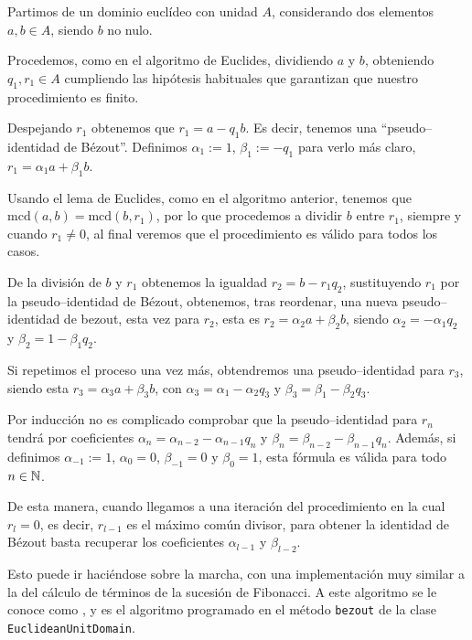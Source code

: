 \documentclass[a4paper, 11pt, twoside, notitlepage, openany, onecolumn, final]{report}
\begin{document}
	Partimos de un dominio euclídeo con unidad $A$, considerando dos elementos $a,b\in A$, siendo $b$ no nulo.
	
	Procedemos, como en el algoritmo de Euclides, dividiendo $a$ y $b$, obteniendo $q_1,r_1\in A$ cumpliendo las hipótesis habituales que garantizan que nuestro procedimiento es finito.
	
	Despejando $r_1$ obtenemos que $r_1=a-q_1b$. Es decir, tenemos una ``pseudo--identidad de Bézout''. Definimos $\alpha_1:=1$, $\beta_1:=-q_1$ para verlo más claro, $r_1 = \alpha_1a +\beta_1b$.
	
	Usando el lema de Euclides, como en el algoritmo anterior, tenemos que $\text{mcd}(a,b)=\text{mcd}(b,r_1)$, por lo que procedemos a dividir $b$ entre $r_1$, siempre y cuando $r_1\not=0$, al final veremos que el procedimiento es válido para todos los casos.
	
	De la división de  $b$ y $r_1$ obtenemos la igualdad $r_2=b-r_1q_2$, sustituyendo $r_1$ por la pseudo--identidad de Bézout, obtenemos, tras reordenar, una nueva pseudo--identidad de bezout, esta vez para $r_2$, esta es $r_2=\alpha_2a+\beta_2b$, siendo $\alpha_2=-\alpha_1q_2$ y $\beta_2=1-\beta_1q_2$.
	
	Si repetimos el proceso una vez más, obtendremos una pseudo--identidad para $r_3$, siendo esta $r_3=\alpha_3a+\beta_3b$, con $\alpha_3=\alpha_1-\alpha_2q_3$ y $\beta_3=\beta_1-\beta_2q_3$.
	
	Por inducción no es complicado comprobar que la pseudo--identidad para $r_n$ tendrá por coeficientes $\alpha_n=\alpha_{n-2}-\alpha_{n-1}q_n$ y $\beta_n=\beta_{n-2}-\beta_{n-1}q_n$. Además, si definimos $\alpha_{-1}:=1$, $\alpha_{0}=0$, $\beta_{-1}=0$ y $\beta_{0}=1$, esta fórmula es válida para todo $n\in\mathbb{N}$.
	
	De esta manera, cuando llegamos a una iteración del procedimiento en la cual $r_l=0$, es decir, $r_{l-1}$ es el máximo común divisor, para obtener la identidad de Bézout basta recuperar los coeficientes $\alpha_{l-1}$ y $\beta_{l-2}$.
	
	Esto puede ir haciéndose sobre la marcha, con una implementación muy similar a la del cálculo de términos de la sucesión de Fibonacci. A este algoritmo se le conoce como , y es el algoritmo programado en el método \texttt{bezout} de la clase \texttt{EuclideanUnitDomain}.
\end{document}
